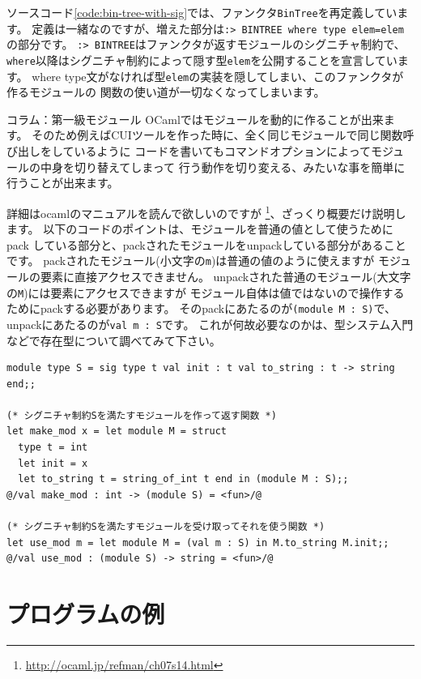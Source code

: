 \documentclass[11pt,a4paper]{article}
\begin{document}
ソースコード\ref{code:bin-tree-with-sig}では、ファンクタ\lstinline{BinTree}を再定義しています。
定義は一緒なのですが、増えた部分は\lstinline{:> BINTREE where type elem=elem}の部分です。
\lstinline{:> BINTREE}はファンクタが返すモジュールのシグニチャ制約で、
\lstinline{where}以降はシグニチャ制約によって隠す型\lstinline{elem}を公開することを宣言しています。
where type文がなければ型\lstinline{elem}の実装を隠してしまい、このファンクタが作るモジュールの
関数の使い道が一切なくなってしまいます。

\begin{itembox}[l]{コラム：第一級モジュール}
OCaml\cite{ocaml}ではモジュールを動的に作ることが出来ます。
そのため例えばCUIツールを作った時に、全く同じモジュールで同じ関数呼び出しをしているように
コードを書いてもコマンドオプションによってモジュールの中身を切り替えてしまって
行う動作を切り変える、みたいな事を簡単に行うことが出来ます。

詳細はocamlのマニュアルを読んで欲しいのですが
\footnote{\url{http://ocaml.jp/refman/ch07s14.html}}、ざっくり概要だけ説明します。
以下のコードのポイントは、モジュールを普通の値として使うためにpack
している部分と、packされたモジュールをunpackしている部分があることです。
packされたモジュール(小文字の\lstinline{m})は普通の値のように使えますが
モジュールの要素に直接アクセスできません。
unpackされた普通のモジュール(大文字の\lstinline{M})には要素にアクセスできますが
モジュール自体は値ではないので操作するためにpackする必要があります。
そのpackにあたるのが\lstinline{(module M : S)}で、unpackにあたるのが\lstinline{val m : S}です。
これが何故必要なのかは、型システム入門などで存在型について調べてみて下さい。

\begin{lstlisting}[caption=第一級モジュール モジュールを作る関数と使う関数]
module type S = sig type t val init : t val to_string : t -> string end;;

(* シグニチャ制約Sを満たすモジュールを作って返す関数 *)
let make_mod x = let module M = struct
  type t = int
  let init = x
  let to_string t = string_of_int t end in (module M : S);;
@/val make_mod : int -> (module S) = <fun>/@

(* シグニチャ制約Sを満たすモジュールを受け取ってそれを使う関数 *)
let use_mod m = let module M = (val m : S) in M.to_string M.init;;
@/val use_mod : (module S) -> string = <fun>/@
\end{lstlisting}
\end{itembox}

\part{プログラムの例}
\end{document}
